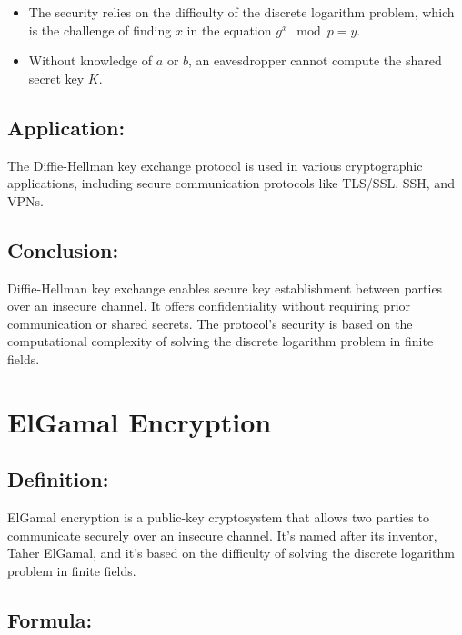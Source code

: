 \documentclass[11pt]{article}
\begin{document}
\begin{itemize}
    \item The security relies on the difficulty of the discrete logarithm problem, which is the challenge of finding $x$ in the equation $g^x \mod p = y$.
    \item Without knowledge of $a$ or $b$, an eavesdropper cannot compute the shared secret key $K$.
\end{itemize}

\subsection{Application:}

The Diffie-Hellman key exchange protocol is used in various cryptographic applications, including secure communication protocols like TLS/SSL, SSH, and VPNs.

\subsection{Conclusion:}

Diffie-Hellman key exchange enables secure key establishment between parties over an insecure channel. It offers confidentiality without requiring prior communication or shared secrets. The protocol's security is based on the computational complexity of solving the discrete logarithm problem in finite fields.

\section{ElGamal Encryption}

\subsection{Definition:}
ElGamal encryption is a public-key cryptosystem that allows two parties to communicate securely over an insecure channel. It's named after its inventor, Taher ElGamal, and it's based on the difficulty of solving the discrete logarithm problem in finite fields.

\subsection{Formula:}
\end{document}
